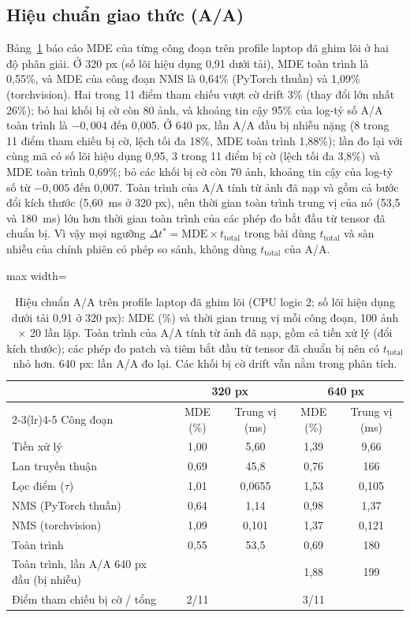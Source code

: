 \documentclass[a4paper,fleqn]{cas-dc}
\begin{document}
\subsection{Hiệu chuẩn giao thức (A/A)}
\label{sec:newprotocol}
Bảng~\ref{tab:aa} báo cáo MDE của từng công đoạn trên profile laptop đã ghim lõi ở hai độ phân giải. Ở 320 px (số lõi hiệu dụng 0,91 dưới tải), MDE toàn trình là 0,55\%, và MDE của công đoạn NMS là 0,64\% (PyTorch thuần) và 1,09\% (torchvision). Hai trong 11 điểm tham chiếu vượt cờ drift 3\% (thay đổi lớn nhất 26\%); bỏ hai khối bị cờ còn 80 ảnh, và khoảng tin cậy 95\% của log-tỷ số A/A toàn trình là $-0{,}004$ đến 0,005. Ở 640 px, lần A/A đầu bị nhiễu nặng (8 trong 11 điểm tham chiếu bị cờ, lệch tối đa 18\%, MDE toàn trình 1,88\%); lần đo lại với cùng mã có số lõi hiệu dụng 0,95, 3 trong 11 điểm bị cờ (lệch tối đa 3,8\%) và MDE toàn trình 0,69\%; bỏ các khối bị cờ còn 70 ảnh, khoảng tin cậy của log-tỷ số từ $-0{,}005$ đến 0,007. Toàn trình của A/A tính từ ảnh đã nạp và gồm cả bước đổi kích thước (5,60~ms ở 320 px), nên thời gian toàn trình trung vị của nó (53,5 và 180~ms) lớn hơn thời gian toàn trình của các phép đo bắt đầu từ tensor đã chuẩn bị. Vì vậy mọi ngưỡng $\Delta t^{*} = \mathrm{MDE}\times t_{\mathrm{total}}$ trong bài dùng $t_{\mathrm{total}}$ và sàn nhiễu của chính phiên có phép so sánh, không dùng $t_{\mathrm{total}}$ của A/A.

\begin{table}[!tp]
\centering\small
\caption{Hiệu chuẩn A/A trên profile laptop đã ghim lõi (CPU logic 2; số lõi hiệu dụng dưới tải 0,91 ở 320 px): MDE (\%) và thời gian trung vị mỗi công đoạn, 100 ảnh $\times$ 20 lần lặp. Toàn trình của A/A tính từ ảnh đã nạp, gồm cả tiền xử lý (đổi kích thước); các phép đo patch và tiêm bắt đầu từ tensor đã chuẩn bị nên có $t_{\mathrm{total}}$ nhỏ hơn. 640 px: lần A/A đo lại. Các khối bị cờ drift vẫn nằm trong phân tích.}
\label{tab:aa}
\begin{adjustbox}{max width=\textwidth}
\begin{tabular}{@{}lcccc@{}}
\toprule
 & \multicolumn{2}{c}{320 px} & \multicolumn{2}{c}{640 px} \\
\cmidrule(lr){2-3}\cmidrule(lr){4-5}
Công đoạn & MDE (\%) & Trung vị (ms) & MDE (\%) & Trung vị (ms) \\
\midrule
Tiền xử lý & 1,00 & 5,60 & 1,39 & 9,66 \\
Lan truyền thuận & 0,69 & 45,8 & 0,76 & 166 \\
Lọc điểm ($\tau$) & 1,01 & 0,0655 & 1,53 & 0,105 \\
NMS (PyTorch thuần) & 0,64 & 1,14 & 0,98 & 1,37 \\
NMS (torchvision) & 1,09 & 0,101 & 1,37 & 0,121 \\
Toàn trình & 0,55 & 53,5 & 0,69 & 180 \\
Toàn trình, lần A/A 640 px đầu (bị nhiễu) & & & 1,88 & 199 \\
Điểm tham chiếu bị cờ / tổng & 2/11 & & 3/11 & \\
\bottomrule
\end{tabular}
\end{adjustbox}
\end{table}
\end{document}
